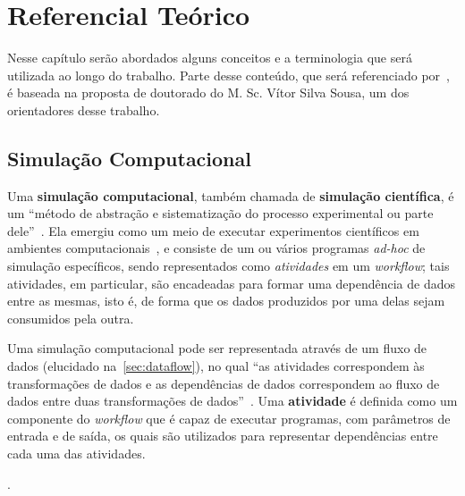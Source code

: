 
\chapter{Referencial Teórico}%
\label{chap:referencial-teorico}

Nesse capítulo serão abordados alguns conceitos e a terminologia que será utilizada ao longo do trabalho. Parte desse conteúdo, que será referenciado por~\cite{silva2015propostadoutorado}, é baseada na proposta de doutorado do \textsf{M. Sc. Vítor Silva Sousa}, um dos orientadores desse trabalho.


\section{Simulação Computacional}

Uma \textbf{simulação computacional}, também chamada de \textbf{simulação científica}, é um ``método de abstração e sistematização do processo experimental ou parte dele''~\cite{silva2015propostadoutorado,dias2015data}. Ela emergiu como um meio de executar experimentos científicos em ambientes computacionais~\cite{ogasawara2011algebraic}, e consiste de um ou vários programas \textit{ad-hoc} de simulação específicos, sendo representados como \textit{atividades} em um \textit{workflow}; tais atividades, em particular, são encadeadas para formar uma dependência de dados entre as mesmas, isto é, de forma que os dados produzidos por uma delas sejam consumidos pela outra.

Uma simulação computacional pode ser representada através de um fluxo de dados (elucidado na~\autoref{sec:dataflow}), no qual ``as atividades correspondem às transformações de dados e as dependências de dados correspondem ao fluxo de dados entre duas transformações de dados''~\cite{silva2015propostadoutorado,ogasawara2011algebraic}. Uma \textbf{atividade} é definida como um componente do \textit{workflow} que é capaz de executar programas, com parâmetros de entrada e de saída, os quais são utilizados para representar dependências entre cada uma das atividades.


.

